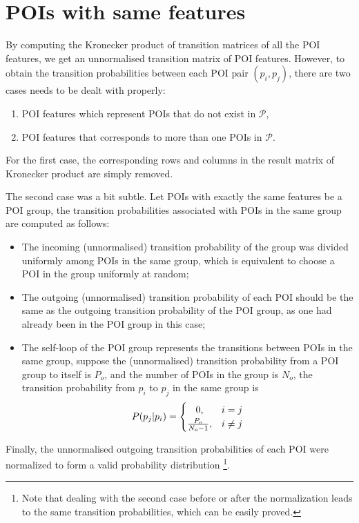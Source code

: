 \section{POIs with same features}


By computing the Kronecker product of transition matrices of all the POI features,
we get an unnormalised transition matrix of POI features.
However, to obtain the transition probabilities between each POI pair $(p_i, p_j)$,
there are two cases needs to be dealt with properly:
\begin{enumerate}
\item POI features which represent POIs that do not exist in $\mathcal{P}$,
\item POI features that corresponds to more than one POIs in $\mathcal{P}$.
\end{enumerate}

For the first case,
the corresponding rows and columns in the result matrix of Kronecker product are simply removed.

The second case was a bit subtle.
Let POIs with exactly the same features be a POI group,
the transition probabilities associated with POIs in the same group are computed as follows:
\begin{itemize}
\item The incoming (unnormalised) transition probability of the group was divided uniformly among POIs
      in the same group, which is equivalent to choose a POI in the group uniformly at random;
\item The outgoing (unnormalised) transition probability of each POI should be the same as the
      outgoing transition probability of the POI group, as one had already been in the POI group in this case;
\item The self-loop of the POI group represents the transitions between POIs in the same group,
      suppose the (unnormalised) transition probability from a POI group to itself is $P_o$,
      and the number of POIs in the group is $N_o$,
      the transition probability from $p_i$ to $p_j$ in the same group is
      \begin{displaymath}
          P(p_j | p_i) =
          \begin{cases}
              \hfill 0, \hfill & i = j \\
              \hfill \frac{P_o}{N_o - 1}, \hfill & i \ne j \\
          \end{cases}
      \end{displaymath}
\end{itemize}
Finally, the unnormalised outgoing transition probabilities of each POI were normalized to form
a valid probability distribution
\footnote{Note that dealing with the second case before or after the normalization leads to
the same transition probabilities, which can be easily proved. }.


